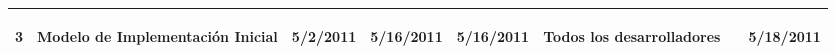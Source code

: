 \begin{center}
\begin{longtable}{|p{}|p{}|p{}|p{}|p{}|p{}|p{}|p{}|}
{\begin{center} 3 \end{center}} & 
{\begin{center} Modelo de Implementación Inicial \end{center}} & 
{\begin{center} 5/2/2011 \end{center}} & 
{\begin{center} 5/16/2011 \end{center}} & 
{\begin{center} 5/16/2011 \end{center}} & 
{\begin{center} Todos los desarrolladores \end{center}} & 
{\begin{center}  \end{center}} & 
{\begin{center} 5/18/2011 \end{center}}\\
\hline

		
		\end{longtable} 
	\end{center}
%